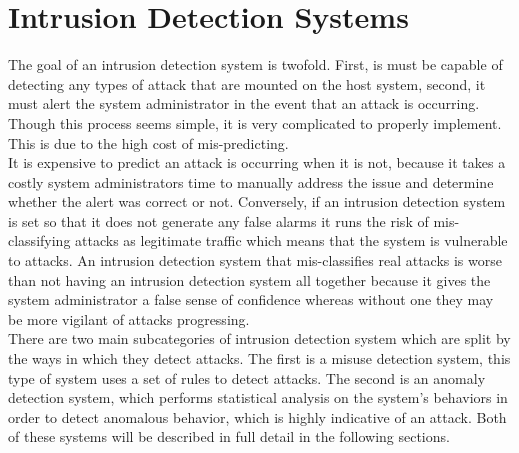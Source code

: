 \documentclass[12pt]{article} %
\begin{document}
\section{Intrusion Detection Systems}
The goal of an intrusion detection system is twofold. First, is must be capable of detecting any types of attack that are mounted on the host system, second, it must alert the system administrator in the event that an attack is occurring. Though this process seems simple, it is very complicated to properly implement. This is due to the high cost of mis-predicting.\\
It is expensive to predict an attack is occurring when it is not, because it takes a costly system administrators time to manually address the issue and determine whether the alert was correct or not. Conversely, if an intrusion detection system is set so that it does not generate any false alarms it runs the risk of mis-classifying attacks as legitimate traffic which means that the system is vulnerable to attacks. An intrusion detection system that mis-classifies real attacks is worse than not having an intrusion detection system all together because it gives the system administrator a false sense of confidence whereas without one they may be more vigilant of attacks progressing.\\
There are two main subcategories of intrusion detection system which are split by the ways in which they detect attacks. The first is a misuse detection system, this type of system uses a set of rules to detect attacks. The second is an anomaly detection system, which performs statistical analysis on the system's behaviors in order to detect anomalous behavior, which is highly indicative of an attack. Both of these systems will be described in full detail in the following sections.\\

\noindent
\end{document}

